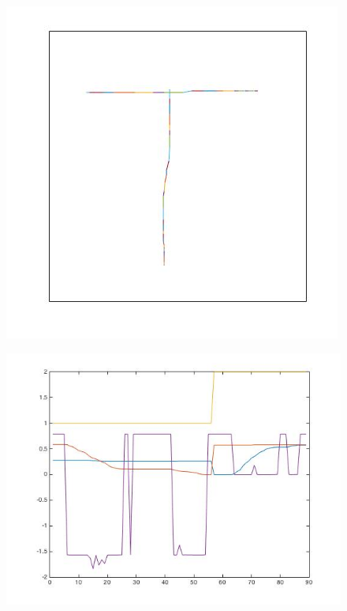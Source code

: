 \begin{figure}[H]
	\centering
	\begin{minipage}{.45\textwidth}
		\centering
		\includegraphics[width=.7\linewidth]{images/T_drawing}
		\label{fig:features_T}
	\end{minipage}%
	\begin{minipage}{.45\textwidth}
		\centering
		\includegraphics[width=.99\linewidth]{images/T_graph}
		\label{fig:features_plus}
	\end{minipage}
\end{figure}
